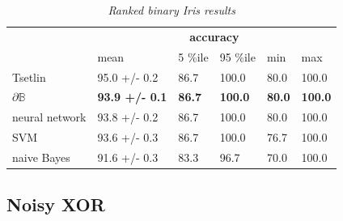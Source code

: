 \documentclass{article} %
\begin{document}
\begin{table}[t]
	\centering
	\begin{tabular}{llllll}
		\cline{2-6}
		\multicolumn{1}{c}{}                       & \multicolumn{5}{c}{\textbf{accuracy}}                                                                                                                                                            \\ \cline{2-6} 
		\multicolumn{1}{l|}{}                      & \multicolumn{1}{l|}{mean}                  & \multicolumn{1}{l|}{5 \%ile}       & \multicolumn{1}{l|}{95 \%ile}       & \multicolumn{1}{l|}{min}           & \multicolumn{1}{l|}{max}            \\ \hline
		\multicolumn{1}{|l|}{Tsetlin}              & \multicolumn{1}{l|}{95.0 +/- 0.2}          & \multicolumn{1}{l|}{86.7}          & \multicolumn{1}{l|}{100.0}          & \multicolumn{1}{l|}{80.0}          & \multicolumn{1}{l|}{100.0}          \\ \hline
		\multicolumn{1}{|l|}{$\partial\mathbb{B}$} & \multicolumn{1}{l|}{\textbf{93.9 +/- 0.1}} & \multicolumn{1}{l|}{\textbf{86.7}} & \multicolumn{1}{l|}{\textbf{100.0}} & \multicolumn{1}{l|}{\textbf{80.0}} & \multicolumn{1}{l|}{\textbf{100.0}} \\ \hline
		\multicolumn{1}{|l|}{neural network}       & \multicolumn{1}{l|}{93.8 +/- 0.2}          & \multicolumn{1}{l|}{86.7}          & \multicolumn{1}{l|}{100.0}           & \multicolumn{1}{l|}{80.0}          & \multicolumn{1}{l|}{100.0}           \\ \hline
		\multicolumn{1}{|l|}{SVM}                  & \multicolumn{1}{l|}{93.6 +/- 0.3}          & \multicolumn{1}{l|}{86.7}          & \multicolumn{1}{l|}{100.0}           & \multicolumn{1}{l|}{76.7}          & \multicolumn{1}{l|}{100.0}           \\ \hline
		\multicolumn{1}{|l|}{naive Bayes}          & \multicolumn{1}{l|}{91.6 +/- 0.3}          & \multicolumn{1}{l|}{83.3}          & \multicolumn{1}{l|}{96.7}           & \multicolumn{1}{l|}{70.0}          & \multicolumn{1}{l|}{100.0}           \\ \hline
	\end{tabular}
	\caption{{\em Ranked binary Iris results}}
	\label{tab:binary-iris-results}
\end{table}


\subsection{Noisy XOR}
\end{document}
